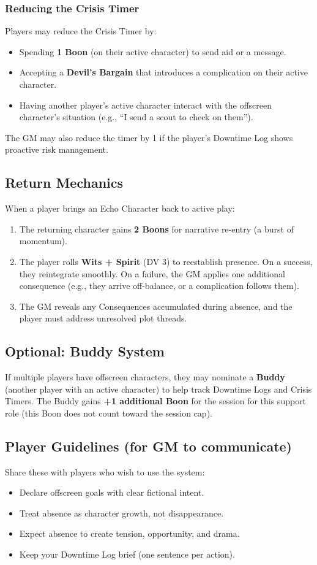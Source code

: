 \subsubsection{Reducing the Crisis Timer }
Players may reduce the Crisis Timer by:
\begin{itemize}
  \item Spending \textbf{1 Boon} (on their active character) to send aid or a message.
  \item Accepting a \textbf{Devil's Bargain} that introduces a complication on their active character.
  \item Having another player's active character interact with the offscreen character's situation (e.g., ``I send a scout to check on them'').
\end{itemize}
The GM may also reduce the timer by 1 if the player's Downtime Log shows proactive risk management.

\subsection{Return Mechanics}
When a player brings an Echo Character back to active play:

\begin{enumerate}
  \item The returning character gains \textbf{2 Boons} for narrative re-entry (a burst of momentum).
  \item The player rolls \textbf{Wits + Spirit} (DV 3) to reestablish presence. On a success, they reintegrate smoothly. On a failure, the GM applies one additional consequence (e.g., they arrive off-balance, or a complication follows them).
  \item The GM reveals any Consequences accumulated during absence, and the player must address unresolved plot threads.
\end{enumerate}

\subsection{Optional: Buddy System}
If multiple players have offscreen characters, they may nominate a \textbf{Buddy} (another player with an active character) to help track Downtime Logs and Crisis Timers. The Buddy gains \textbf{+1 additional Boon} for the session for this support role (this Boon does not count toward the session cap).

\subsection{Player Guidelines (for GM to communicate)}
Share these with players who wish to use the system:
\begin{itemize}
  \item Declare offscreen goals with clear fictional intent.
  \item Treat absence as character growth, not disappearance.
  \item Expect absence to create tension, opportunity, and drama.
  \item Keep your Downtime Log brief (one sentence per action).
\end{itemize}

